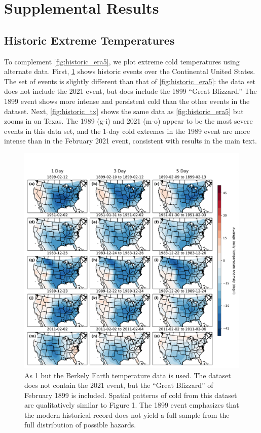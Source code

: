 \documentclass[12pt]{iopart}
\begin{document}
\clearpage
\appendix
\section{Supplemental Results}
\renewcommand{\thefigure}{S\arabic{figure}}
\setcounter{figure}{0}

\subsection{Historic Extreme Temperatures}

To complement \cref{fig:historic_era5}, we plot extreme cold temperatures using alternate data.
First, \cref{fig:historic_bk} shows historic events over the Continental United States.
The set of events is slightly different than that of \cref{fig:historic_era5}: the data set does not include the 2021 event, but does include the 1899 ``Great Blizzard.''
The 1899 event shows more intense and persistent cold than the other events in the dataset.
Next, \cref{fig:historic_tx} shows the same data as \cref{fig:historic_era5} but zooms in on Texas.
The 1989 (g-i) and 2021 (m-o) appear to be the most severe events in this data set, and the 1-day cold extremes in the 1989 event are more intense than in the February 2021 event, consistent with results in the main text.

\begin{figure}
  \centering
  \includegraphics[width=\textwidth]{historic_events_bk.pdf}
  \caption{
    As \cref{fig:historic_bk} but the Berkely Earth temperature data is used.
    The dataset does not contain the 2021 event, but the ``Great Blizzard'' of February 1899 is included.
    Spatial patterns of cold from this dataset are qualitatively similar to Figure 1.
    The 1899 event emphasizes that the modern historical record does not yield a full sample from the full distribution of possible hazards.
  }\label{fig:historic_bk}
\end{figure}
\end{document}
